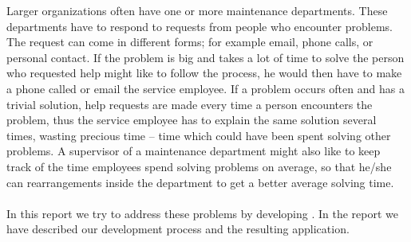 Larger organizations often have one or more maintenance departments.
These departments have to respond to requests from people who encounter problems. 
The request can come in different forms; for example email, phone calls, or personal contact. 
If the problem is big and takes a lot of time to solve the person who requested help might like to follow the process, he would then have to make a phone called or email the service employee. 
If a problem occurs often and has a trivial solution, help requests are made every time a person encounters the problem, thus the service employee has to explain the same solution several times, wasting precious time -- time which could have been spent solving other problems.
A supervisor of a maintenance department might also like to keep track of the time employees spend solving problems on average, so that he/she can rearrangements inside the department to get a better average solving time.\\
\ \\
In this report we try to address these problems by developing \hdesk[]. In the report we have described our development process and the resulting application.